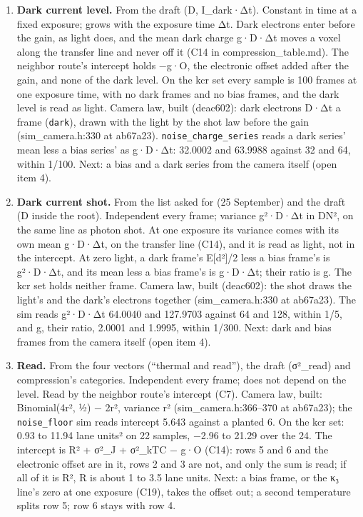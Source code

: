 \begin{enumerate}
\begin{itemize}
\end{itemize}
\item \textbf{Dark current level.} From the draft (D, I\_\allowbreak{}dark·Δt). Constant in time at a fixed exposure; grows with the exposure time Δt. Dark electrons enter before the gain, as light does, and the mean dark charge g·D·Δt moves a voxel along the transfer line and never off it (C14 in compression\_\allowbreak{}table.md). The neighbor route's intercept holds −g·O, the electronic offset added after the gain, and none of the dark level. On the kcr set every sample is 100 frames at one exposure time, with no dark frames and no bias frames, and the dark level is read as light. Camera law, built (deac602): dark electrons D·Δt a frame (\texttt{dark}), drawn with the light by the shot law before the gain (sim\_\allowbreak{}camera.h:330 at ab67a23). \texttt{noise\_\allowbreak{}charge\_\allowbreak{}series} reads a dark series' mean less a bias series' as g·D·Δt: 32.0002 and 63.9988 against 32 and 64, within 1/100. Next: a bias and a dark series from the camera itself (open item 4).
\item \textbf{Dark current shot.} From the list asked for (25 September) and the draft (D inside the root). Independent every frame; variance g²·D·Δt in DN², on the same line as photon shot. At one exposure its variance comes with its own mean g·D·Δt, on the transfer line (C14), and it is read as light, not in the intercept. At zero light, a dark frame's E[d²]/2 less a bias frame's is g²·D·Δt, and its mean less a bias frame's is g·D·Δt; their ratio is g. The kcr set holds neither frame. Camera law, built (deac602): the shot draws the light's and the dark's electrons together (sim\_\allowbreak{}camera.h:330 at ab67a23). The sim reads g²·D·Δt 64.0040 and 127.9703 against 64 and 128, within 1/5, and g, their ratio, 2.0001 and 1.9995, within 1/300. Next: dark and bias frames from the camera itself (open item 4).
\item \textbf{Read.} From the four vectors (“thermal and read”), the draft (σ²\_\allowbreak{}read) and compression's categories. Independent every frame; does not depend on the level. Read by the neighbor route's intercept (C7). Camera law, built: Binomial(4r², ½) − 2r², variance r² (sim\_\allowbreak{}camera.h:366–370 at ab67a23); the \texttt{noise\_\allowbreak{}floor} sim reads intercept 5.643 against a planted 6. On the kcr set: 0.93 to 11.94 lane units² on 22 samples, −2.96 to 21.29 over the 24. The intercept is R² + σ²\_\allowbreak{}J + σ²\_\allowbreak{}kTC − g·O (C14): rows 5 and 6 and the electronic offset are in it, rows 2 and 3 are not, and only the sum is read; if all of it is R², R is about 1 to 3.5 lane units. Next: a bias frame, or the κ₃ line's zero at one exposure (C19), takes the offset out; a second temperature splits row 5; row 6 stays with row 4.

\end{enumerate}

